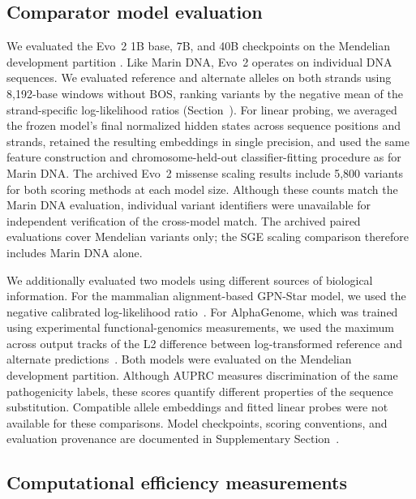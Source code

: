 \documentclass[a4paper,num-refs]{oup-contemporary}
\begin{document}
\subsection{Comparator model evaluation}
\label{methods:comparators}

We evaluated the Evo~2 1B base, 7B, and 40B checkpoints on the
Mendelian development partition
\citep{brixi2026evo2,marindna131,marindnaevo2code}.
Like Marin DNA, Evo~2 operates on individual DNA sequences.
We evaluated reference and alternate alleles on both strands using
8,192-base windows without BOS, ranking variants by the negative
mean of the strand-specific log-likelihood ratios
(Section~).
For linear probing, we averaged the frozen model's final normalized
hidden states across sequence positions and strands, retained the
resulting embeddings in single precision, and used the same feature
construction and chromosome-held-out classifier-fitting procedure
as for Marin DNA.
The archived Evo~2 missense scaling results include 5,800 variants
for both scoring methods at each model size.
Although these counts match the Marin DNA evaluation, individual
variant identifiers were unavailable for independent verification
of the cross-model match.
The archived paired evaluations cover Mendelian variants only;
the SGE scaling comparison therefore includes Marin DNA alone.

We additionally evaluated two models using different sources of
biological information.
For the mammalian alignment-based GPN-Star model, we used the
negative calibrated log-likelihood ratio~\citep{ye2025gpnstar}.
For AlphaGenome, which was trained using experimental
functional-genomics measurements, we used the maximum across
output tracks of the L2 difference between log-transformed
reference and alternate predictions~\citep{avsec2026alphagenome}.
Both models were evaluated on the Mendelian development partition.
Although AUPRC measures discrimination of the same pathogenicity
labels, these scores quantify different properties of the sequence
substitution.
Compatible allele embeddings and fitted linear probes were not
available for these comparisons.
Model checkpoints, scoring conventions, and evaluation provenance
are documented in Supplementary
Section~.


\subsection{Computational efficiency measurements}
\label{methods:efficiency}
\end{document}
